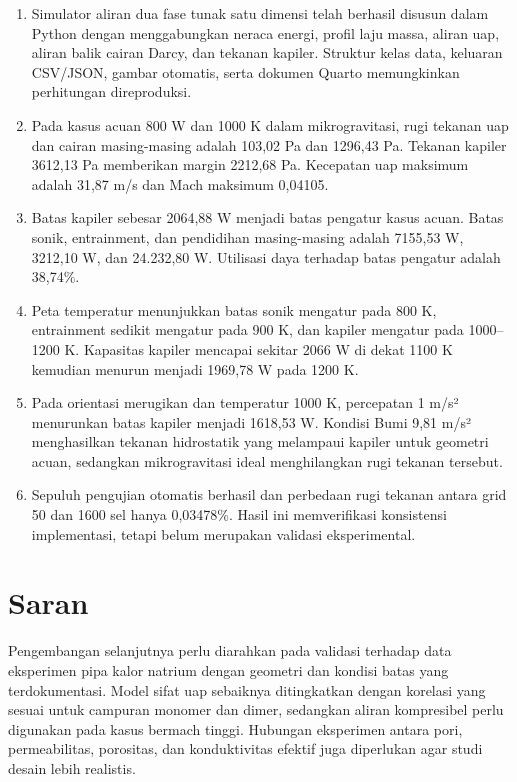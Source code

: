 \documentclass[
  12pt,
  12pt,a4paper,oneside]{report}
\providecommand{\tightlist}{%
  \setlength{\itemsep}{0pt}\setlength{\parskip}{0pt}}
\begin{document}
\begin{enumerate}
\def\labelenumi{\arabic{enumi}.}
\tightlist
\item
  Simulator aliran dua fase tunak satu dimensi telah berhasil disusun
  dalam Python dengan menggabungkan neraca energi, profil laju massa,
  aliran uap, aliran balik cairan Darcy, dan tekanan kapiler. Struktur
  kelas data, keluaran CSV/JSON, gambar otomatis, serta dokumen Quarto
  memungkinkan perhitungan direproduksi.
\item
  Pada kasus acuan 800 W dan 1000 K dalam mikrogravitasi, rugi tekanan
  uap dan cairan masing-masing adalah 103,02 Pa dan 1296,43 Pa. Tekanan
  kapiler 3612,13 Pa memberikan margin 2212,68 Pa. Kecepatan uap
  maksimum adalah 31,87 m/s dan Mach maksimum 0,04105.
\item
  Batas kapiler sebesar 2064,88 W menjadi batas pengatur kasus acuan.
  Batas sonik, entrainment, dan pendidihan masing-masing adalah 7155,53
  W, 3212,10 W, dan 24.232,80 W. Utilisasi daya terhadap batas pengatur
  adalah 38,74\%.
\item
  Peta temperatur menunjukkan batas sonik mengatur pada 800 K,
  entrainment sedikit mengatur pada 900 K, dan kapiler mengatur pada
  1000--1200 K. Kapasitas kapiler mencapai sekitar 2066 W di dekat 1100
  K kemudian menurun menjadi 1969,78 W pada 1200 K.
\item
  Pada orientasi merugikan dan temperatur 1000 K, percepatan 1 m/s²
  menurunkan batas kapiler menjadi 1618,53 W. Kondisi Bumi 9,81 m/s²
  menghasilkan tekanan hidrostatik yang melampaui kapiler untuk geometri
  acuan, sedangkan mikrogravitasi ideal menghilangkan rugi tekanan
  tersebut.
\item
  Sepuluh pengujian otomatis berhasil dan perbedaan rugi tekanan antara
  grid 50 dan 1600 sel hanya 0,03478\%. Hasil ini memverifikasi
  konsistensi implementasi, tetapi belum merupakan validasi
  eksperimental.
\end{enumerate}

\hypertarget{saran}{%
\section{Saran}\label{saran}}

Pengembangan selanjutnya perlu diarahkan pada validasi terhadap data
eksperimen pipa kalor natrium dengan geometri dan kondisi batas yang
terdokumentasi. Model sifat uap sebaiknya ditingkatkan dengan korelasi
yang sesuai untuk campuran monomer dan dimer, sedangkan aliran
kompresibel perlu digunakan pada kasus bermach tinggi. Hubungan
eksperimen antara pori, permeabilitas, porositas, dan konduktivitas
efektif juga diperlukan agar studi desain lebih realistis.
\end{document}
